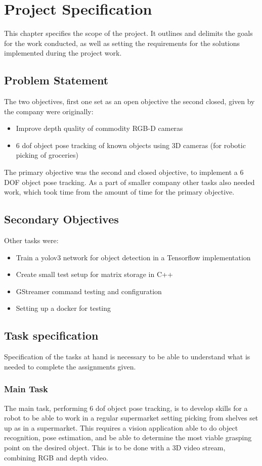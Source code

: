 \chapter{Project Specification}\label{ch:projectspec}\glsresetall
This chapter specifies the scope of the project. It outlines and delimits the goals for the work conducted, as well as setting the requirements for the solutions implemented during the project work. \\

\section{Problem Statement}
The two objectives, first one set as an open objective the second closed, given by the company were originally:
\begin{itemize}
	\item Improve depth quality of commodity RGB-D cameras
	\item 6 \gls{dof} object pose tracking of known objects using 3D cameras (for robotic picking of groceries)
\end{itemize}

The primary objective was the second and closed objective, to implement a 6 DOF object pose tracking.
As a part of smaller company other tasks also needed work, which took time from the amount of time for the primary objective. 

\section{Secondary Objectives}
Other tasks were:
\begin{itemize}
	\item Train a \gls{yolo}v3 network for object detection in a Tensorflow implementation
	\item Create small test setup for matrix storage in C++
	\item GStreamer command testing and configuration
	\item Setting up a docker for testing
\end{itemize}

\section{Task specification}
Specification of the tasks at hand is necessary to be able to understand what is needed to complete the assignments given.

\subsection{Main Task}\label{sec:main_task}
The main task, performing 6 \gls{dof} object pose tracking, is to develop skills for a robot to be able to work in a regular supermarket setting picking from shelves set up as in a supermarket. This requires a vision application able to do object recognition, pose estimation, and be able to determine the most viable grasping point on the desired object. 
This is to be done with a 3D video stream, combining RGB and depth video. 


